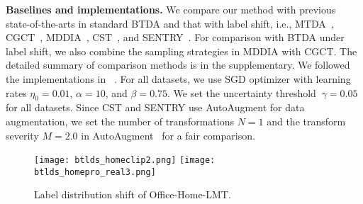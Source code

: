 \documentclass[letterpaper]{article} \usepackage{aaai23}  \usepackage{times}  \usepackage{helvet}  \usepackage{courier}  \usepackage[hyphens]{url}  \usepackage{graphicx} \urlstyle{rm} \def\UrlFont{\rm}  \usepackage{natbib}  \usepackage{caption} \frenchspacing  \setlength{\pdfpagewidth}{8.5in}  \setlength{\pdfpageheight}{11in}
\begin{document}
\noindent\textbf{Baselines and implementations.}
We compare our method with previous state-of-the-arts in standard BTDA and that with label shift, i.e., MTDA~\cite{nguyen2021unsupervised}, CGCT~\cite{roy2021curriculum}, MDDIA~\cite{jiang2020implicit}, CST~\cite{liu2021cycle}, and SENTRY~\cite{prabhu2021sentry}. For comparison with BTDA under label shift, we also combine the sampling strategies in MDDIA with CGCT. The detailed summary of comparison methods is in the supplementary. We followed the implementations in ~\cite{dalib}. For all datasets, we use SGD optimizer with learning rates $\eta_0 = 0.01$, $\alpha = 10$, and $\beta = 0.75$. We set the uncertainty threshold $\ \gamma = 0.05$ for all datasets. Since CST and SENTRY use AutoAugment for data augmentation, we set the number of transformations $N=1$ and the transform severity $M=2.0$ in AutoAugment~\cite{lim2019fast} for a fair comparison.

\begin{figure}[!htbp]
    \centering
    \texttt{[image: btlds\_homeclip2.png]}
    \texttt{[image: btlds\_homepro\_real3.png]}
\caption{Label distribution shift of Office-Home-LMT.}
\label{btda_lmt}
\end{figure}
\end{document}
